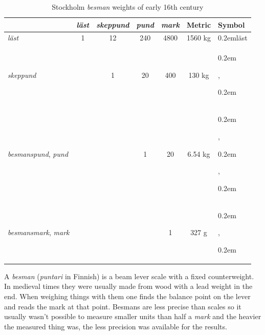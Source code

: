 \documentclass[a4paper]{article}
\newcommand{\samplefont}{\fontsize{16}{16}\abcursivefamily\spaceskip0.2em}
\newcommand{\sample}[1]{{\samplefont #1 \strut}}
\begin{document}
\begin{table}
\begin{tabular}{lcccc|cl}
  & \emph{läst} & \emph{skeppund} & \emph{pund} & \emph{mark} & Metric &
  Symbol \\
  \hline
  \emph{läst}        & 1 & 12 & 240 & 4800 &  1560 kg & \sample{läst} \\
  \emph{skeppund}    &   & 1  & 20  &  400 &  130 kg &
  \sample{\abskeppund}, \sample{\abskeppundtwo} \\
  \emph{besmanspund}, \emph{pund} &   &    & 1   &  20 &  6.54 kg  &
  \sample{\abbesmanspund}, \sample{\abpund}, \sample{\abpundtwo} \\
  \emph{besmansmark}, \emph{mark} &   &    &     &  1 &   327 g & \sample{\abmark},
  \sample{\abmarc} \\
\end{tabular}
  \caption{Stockholm \emph{besman} weights of early 16th century}
  \label{tab:besman_weights}
\end{table}


A \emph{besman} (\emph{puntari} in Finnish) is a beam lever scale with
a fixed counterweight. In medieval times they were usually made from
wood with a lead weight in the end. When weighing things with them one
finds the balance point on the lever and reads the mark at that point.
Besmans are less precise than scales so it usually wasn't possible to
measure smaller units than half a \emph{mark} and the heavier the
measured thing was, the less precision was available for the results.
\end{document}
